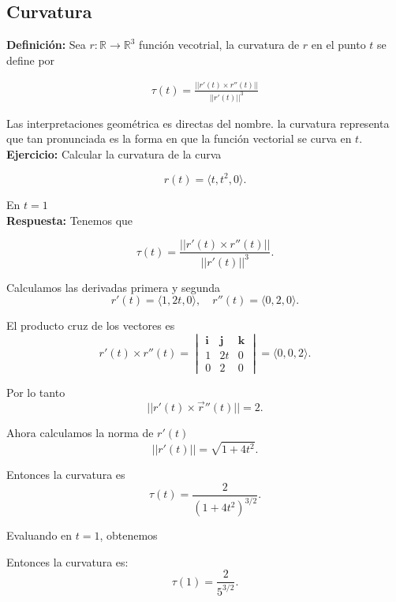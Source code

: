\documentclass{article}
\theoremstyle{definition}
\begin{document}
\newpage

\subsection{Curvatura}


\textbf{Definición:} Sea $r: \mathbb{R} \to \mathbb{R}^3$ función vecotrial, la curvatura de $r$ en el punto $t$ se define por

\begin{align*}
    \tau(t) = \frac{||r'(t) \times r''(t)||}{|| r'(t)||^3}
\end{align*}






Las interpretaciones geométrica es directas del nombre. la curvatura representa que tan pronunciada es la forma en que la funci\'on vectorial se curva en $t$. \\

\textbf{Ejercicio:} Calcular la curvatura de la curva

\[
r(t) = \langle t, t^2, 0 \rangle.
\]

En $t=1$ \\

\textbf{Respuesta:} Tenemos que

\[
\tau(t) = \frac{||r'(t) \times r''(t)||}{||r'(t)||^3}.
\]

Calculamos las derivadas primera y segunda
\[
r'(t) = \langle 1, 2t, 0 \rangle, \quad r''(t) = \langle 0, 2, 0 \rangle.
\]

El producto cruz de los vectores es
\[
r'(t) \times r''(t) = 
\begin{vmatrix}
\mathbf{i} & \mathbf{j} & \mathbf{k} \\
1 & 2t & 0 \\
0 & 2 & 0
\end{vmatrix}
= \langle 0, 0, 2 \rangle.
\]

Por lo tanto
\[
||r'(t) \times \vec{r}''(t)|| = 2.
\]

Ahora calculamos la norma de \( r'(t) \)
\[
||r'(t)|| = \sqrt{1 + 4t^2}.
\]

Entonces la curvatura es
\[
\tau(t) = \frac{2}{(1 + 4t^2)^{3/2}}.
\]

Evaluando en $t=1$, obtenemos

Entonces la curvatura es:
\[
\tau(1) = \frac{2}{5^{3/2}}.
\]
\end{document}
